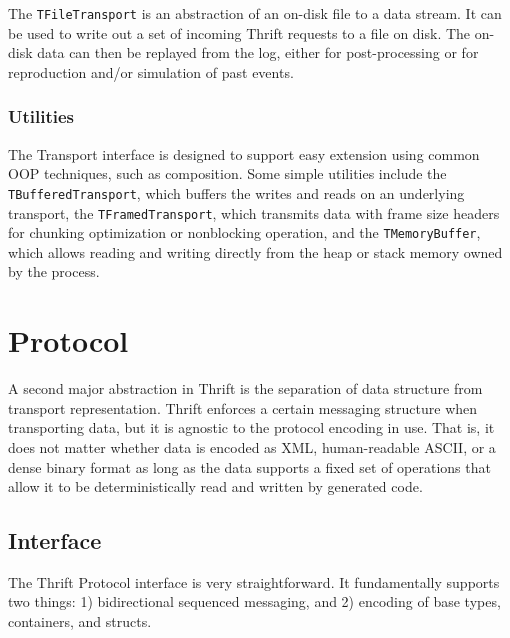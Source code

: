 \documentclass[nocopyrightspace,blockstyle]{sigplanconf}
\begin{document}
The \texttt{TFileTransport} is an abstraction of an on-disk file to a data
stream. It can be used to write out a set of incoming Thrift requests to a file
on disk. The on-disk data can then be replayed from the log, either for
post-processing or for reproduction and/or simulation of past events.

\subsubsection{Utilities}

The Transport interface is designed to support easy extension using common
OOP techniques, such as composition. Some simple utilities include the
\texttt{TBufferedTransport}, which buffers the writes and reads on an
underlying transport, the \texttt{TFramedTransport}, which transmits data with frame
size headers for chunking optimization or nonblocking operation, and the
\texttt{TMemoryBuffer}, which allows reading and writing directly from the heap
or stack memory owned by the process.

\section{Protocol}

A second major abstraction in Thrift is the separation of data structure from
transport representation. Thrift enforces a certain messaging structure when
transporting data, but it is agnostic to the protocol encoding in use. That is,
it does not matter whether data is encoded as XML, human-readable ASCII, or a
dense binary format as long as the data supports a fixed set of operations
that allow it to be deterministically read and written by generated code.

\subsection{Interface}

The Thrift Protocol interface is very straightforward. It fundamentally
supports two things: 1) bidirectional sequenced messaging, and
2) encoding of base types, containers, and structs.
\end{document}
